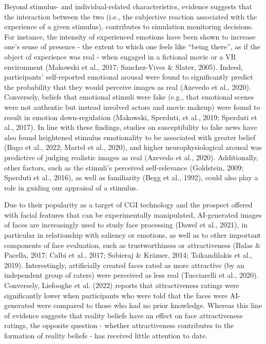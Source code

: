 \documentclass[
  man,floatsintext]{apa6}
\begin{document}
Beyond stimulus- and individual-related characteristics, evidence suggests that the interaction between the two (i.e., the subjective reaction associated with the experience of a given stimulus), contributes to simulation monitoring decisions. For instance, the intensity of experienced emotions have been shown to increase one's sense of presence - the extent to which one feels like ``being there'', as if the object of experience was real - when engaged in a fictional movie or a VR environment (Makowski et al., 2017; Sanchez-Vives \& Slater, 2005). Indeed, participants' self-reported emotional arousal were found to significantly predict the probability that they would perceive images as real (Azevedo et al., 2020). Conversely, beliefs that emotional stimuli were fake (e.g., that emotional scenes were not authentic but instead involved actors and movie makeup) were found to result in emotion down-regulation (Makowski, Sperduti, et al., 2019; Sperduti et al., 2017). In line with these findings, studies on susceptibility to fake news have also found heightened stimulus emotionality to be associated with greater belief (Bago et al., 2022; Martel et al., 2020), and higher neurophysiological arousal was predictive of judging realistic images as real (Azevedo et al., 2020). Additionally, other factors, such as the stimuli's perceived self-relevance (Goldstein, 2009; Sperduti et al., 2016), as well as familiarity (Begg et al., 1992), could also play a role in guiding our appraisal of a stimulus.

Due to their popularity as a target of CGI technology and the prospect offered with facial features that can be experimentally manipulated, AI-generated images of faces are increasingly used to study face processing (Dawel et al., 2021), in particular in relationship with saliency or emotions, as well as to other important components of face evaluation, such as trustworthiness or attractiveness (Balas \& Pacella, 2017; Calbi et al., 2017; Sobieraj \& Krämer, 2014; Tsikandilakis et al., 2019). Interestingly, artificially created faces rated as more attractive (by an independent group of raters) were perceived as less real (Tucciarelli et al., 2020). Conversely, Liefooghe et al. (2022) reports that attractiveness ratings were significantly lower when participants who were told that the faces were AI-generated were compared to those who had no prior knowledge. Whereas this line of evidence suggests that reality beliefs have an effect on face attractiveness ratings, the opposite question - whether attractiveness contributes to the formation of reality beliefs - has received little attention to date.
\end{document}
